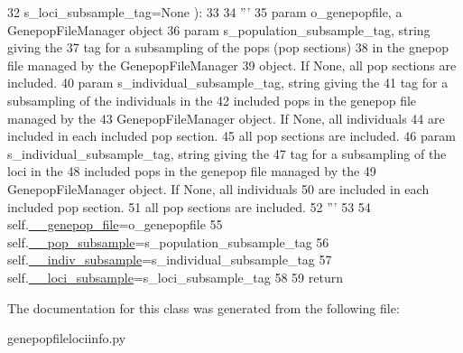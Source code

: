 \begin{DoxyCode}
32                             s\_loci\_subsample\_tag=\textcolor{keywordtype}{None} ):
33 
34         \textcolor{stringliteral}{'''}
35 \textcolor{stringliteral}{        param o\_genepopfile, a GenepopFileManager object}
36 \textcolor{stringliteral}{        param s\_population\_subsample\_tag, string giving the}
37 \textcolor{stringliteral}{              tag for a subsampling of the pops (pop sections)}
38 \textcolor{stringliteral}{              in the gnepop file managed by the GenepopFileManager}
39 \textcolor{stringliteral}{              object. If None, all pop sections are included.}
40 \textcolor{stringliteral}{        param s\_individual\_subsample\_tag, string giving the}
41 \textcolor{stringliteral}{              tag for a subsampling of the individuals in the}
42 \textcolor{stringliteral}{              included pops in the genepop file managed by the }
43 \textcolor{stringliteral}{              GenepopFileManager object. If None, all individuals}
44 \textcolor{stringliteral}{              are included in each included pop section.}
45 \textcolor{stringliteral}{              all pop sections are included.}
46 \textcolor{stringliteral}{        param s\_individual\_subsample\_tag, string giving the}
47 \textcolor{stringliteral}{              tag for a subsampling of the loci in the}
48 \textcolor{stringliteral}{              included pops in the genepop file managed by the }
49 \textcolor{stringliteral}{              GenepopFileManager object. If None, all individuals}
50 \textcolor{stringliteral}{              are included in each included pop section.}
51 \textcolor{stringliteral}{              all pop sections are included.}
52 \textcolor{stringliteral}{        '''}
53 
54         self.\hyperlink{classnegui_1_1genepopfilelociinfo_1_1GenepopFileLociInfo_a11adb337e651f0218f32c66062f3eb9a}{\_\_genepop\_file}=o\_genepopfile
55         self.\hyperlink{classnegui_1_1genepopfilelociinfo_1_1GenepopFileLociInfo_a966eba4c51d001cee90f59914911334f}{\_\_pop\_subsample}=s\_population\_subsample\_tag
56         self.\hyperlink{classnegui_1_1genepopfilelociinfo_1_1GenepopFileLociInfo_abc390fd8a9530ccdf44595fc2e828e69}{\_\_indiv\_subsample}=s\_individual\_subsample\_tag
57         self.\hyperlink{classnegui_1_1genepopfilelociinfo_1_1GenepopFileLociInfo_a90e54c1c2cf515a05f76d5f10b8730d8}{\_\_loci\_subsample}=s\_loci\_subsample\_tag
58         
59         \textcolor{keywordflow}{return}
\end{DoxyCode}


The documentation for this class was generated from the following file\+:\begin{DoxyCompactItemize}
\item 
genepopfilelociinfo.\+py\end{DoxyCompactItemize}
